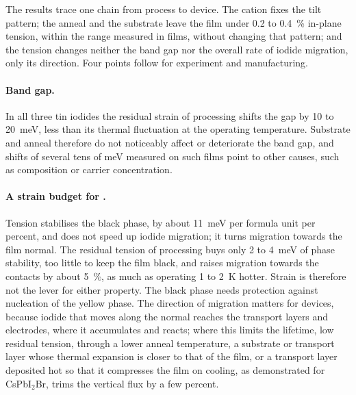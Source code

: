 
The results trace one chain from process to device. The cation fixes the tilt pattern; the anneal and the substrate
leave the film under 0.2 to \SI{0.4}{\percent} in-plane tension, within the range measured in films, without changing
that pattern; and the tension changes neither the band gap nor the overall rate of iodide migration, only its
direction. Four points follow for experiment
and manufacturing.

\paragraph{Band gap.} In all three tin iodides the residual strain of processing shifts the gap by 10 to \SI{20}{meV},
less than its thermal fluctuation at the operating temperature. Substrate and anneal therefore do not noticeably affect or
deteriorate the band gap, and shifts of several tens of meV measured on such films point to other causes, such as composition or
carrier concentration.

\paragraph{A strain budget for \CsSnI{}.} Tension stabilises the black phase, by about \SI{11}{meV} per formula unit
per percent, and does not speed up iodide migration; it turns migration towards the film normal. The residual tension
of processing buys only 2 to \SI{4}{meV} of phase stability, too little to keep the film black, and raises migration
towards the contacts by about \SI{5}{\percent}, as much as operating 1 to \SI{2}{K} hotter. Strain is therefore not the
lever for either property. The black phase needs protection against nucleation of the yellow phase. The direction of
migration matters for devices, because iodide that moves along the normal reaches the transport layers and electrodes,
where it accumulates and reacts; where this limits the lifetime, low residual tension, through a lower anneal
temperature, a substrate or transport layer whose thermal expansion is closer to that of the film, or a transport layer
deposited hot so that it compresses the film on cooling, as demonstrated for CsPbI$_2$Br,\cite{ref_processing_temp}
trims the vertical flux by a few percent.

